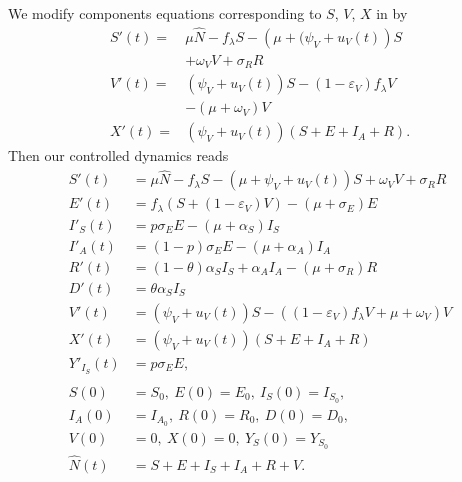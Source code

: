 We modify components equations corresponding to $S$, $V$, $X$ in 
 by
\begin{equation}
    \label{eqn:counter}
    \begin{aligned}
        S'(t)  = &
            \mu \widehat{N} - f_{\lambda}S - 
            \left(
                \mu + (\psi_V + u_V(t)
            \right) S
        \\
            &
             + \omega_V V + \sigma_{R} R
        \\
        V'(t) = &
            \left(\psi_V + u_V(t)\right) S-(1-\varepsilon_V)
            f_{\lambda}V
        \\
            &-
             (\mu+\omega_V) V
        \\
        X'(t) =&
        \left(\psi_V + u_V(t)\right) (S + E + I_A + R).
    \end{aligned}
\end{equation}
%
Then our controlled dynamics reads
%
\begin{equation}
    \label{eqn:controlled_ode}
    \begin{aligned}
        S'(t)
        &=
        \mu \widehat{N} - f_{\lambda} S - 
        ( \mu + \psi_V +  u_V(t)) S + \omega_V V + \sigma_{R} R  
        \\
        E'(t)
        &=
        f_{\lambda} (S + (1-\varepsilon_V) V)
        - (\mu+\sigma_E) E
        \\
        I'_S(t)
        &=p
        \sigma_E
        E-(\mu + \alpha_S) I_S
        \\
        I'_A(t)
        &= (1 - p) \sigma_E E-(\mu + \alpha_A) I_A
        \\
        R'(t)
        &= (1 - \theta) \alpha_S I_S + \alpha_A I_A
        - (\mu + \sigma_{R}) R
        \\
        D'(t)&=
        \theta \alpha_S I_S
        \\
        V'(t)&=
        (\psi_V + u_V(t)) S -
        \left(
        (1 -\varepsilon_V) f_{\lambda} V +
        \mu + \omega_V
        \right) V
        \\
        X'(t)&=
        (\psi_V + u_V(t))(S + E + I_A + R)
        \\
        Y'_{I_S}(t) &=p
        \sigma_E E,
        \\
        \\
        S(0) &= S_0, \ E(0) = E_0, \ I_S(0) = I_{S_{0}},
        \\
        I_A(0) &= I_{A_{0}}, \ R(0) = R_0, \ D(0) = D_0,
        \\
        V(0) &= 0, \ X(0) = 0, \ Y_S(0) = Y_{S_0}
        \\
        \widehat{N}(t) &= S + E + I_S + I_A + R + V.
    \end{aligned}
\end{equation}

